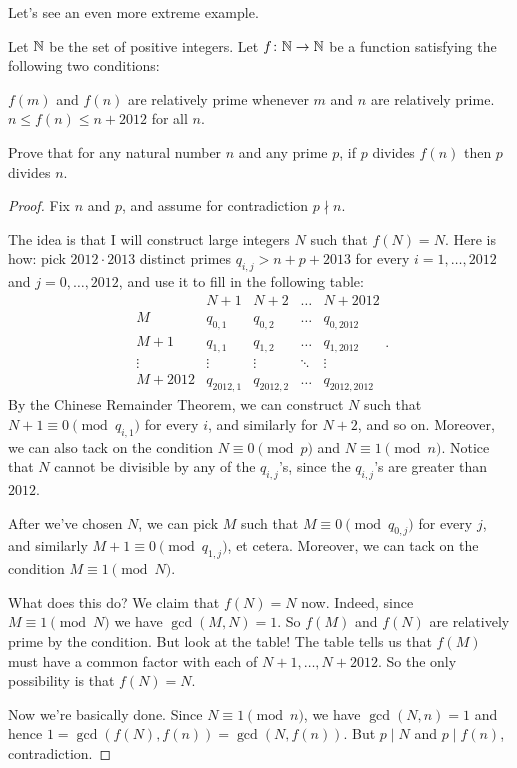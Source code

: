 \documentclass[11pt]{scrartcl}
\begin{document}
Let's see an even more extreme example.
\begin{example}
  [TSTST 2012/3]
  Let $\mathbb N$ be the set of positive integers.
  Let $f \colon \mathbb N \to \mathbb N$ be a function satisfying the following two conditions:
  \begin{enumerate}[(a)]
   \ii $f(m)$ and $f(n)$ are relatively prime whenever $m$ and $n$ are relatively prime.
   \ii $n \le f(n) \le n+2012$ for all $n$.
  \end{enumerate}
  Prove that for any natural number $n$ and any prime $p$,
  if $p$ divides $f(n)$ then $p$ divides $n$.
\end{example}
\begin{proof}
  Fix $n$ and $p$, and assume for contradiction $p \nmid n$.

  The idea is that I will construct large integers $N$
  such that $f(N) = N$.
  Here is how: pick $2012 \cdot 2013$ distinct primes $q_{i,j} > n+p+2013$
  for every $i=1,\dots,2012$ and $j=0,\dots,2012$,
  and use it to fill in the following table:
  \[
    \begin{array}{c|cccc}
      & N+1 & N+2 & \dots & N+2012 \\ \hline
      M & q_{0,1} & q_{0,2} & \dots & q_{0,2012} \\
      M+1 & q_{1,1} & q_{1,2} & \dots & q_{1,2012} \\
      \vdots & \vdots & \vdots & \ddots & \vdots \\
      M+2012 & q_{2012,1} & q_{2012,2} & \dots & q_{2012,2012}
    \end{array}.
  \]
  By the Chinese Remainder Theorem, we can construct $N$
  such that $N+1 \equiv 0 \pmod{q_{i,1}}$ for every $i$,
  and similarly for $N+2$, and so on.
  Moreover, we can also tack on the condition $N \equiv 0 \pmod p$
  and $N \equiv 1 \pmod n$.
  Notice that $N$ cannot be divisible by any of the $q_{i,j}$'s,
  since the $q_{i,j}$'s are greater than $2012$.

  After we've chosen $N$, we can pick $M$ such that $M \equiv 0 \pmod{q_{0,j}}$ for every $j$,
  and similarly $M+1 \equiv 0 \pmod{q_{1,j}}$, et cetera.
  Moreover, we can tack on the condition $M \equiv 1 \pmod N$.

  What does this do?
  We claim that $f(N) = N$ now.
  Indeed, since $M \equiv 1 \pmod N$ we have $\gcd(M,N) = 1$.
  So $f(M)$ and $f(N)$ are relatively prime by the condition.
  But look at the table!
  The table tells us that $f(M)$ must have a common factor
  with each of $N+1, \dots, N+2012$.
  So the only possibility is that $f(N) = N$.

  Now we're basically done.
  Since $N \equiv 1 \pmod n$, we have $\gcd(N,n) = 1$
  and hence $1 = \gcd(f(N), f(n)) = \gcd(N, f(n))$.
  But $p \mid N$ and $p \mid f(n)$, contradiction.
\end{proof}
\end{document}
